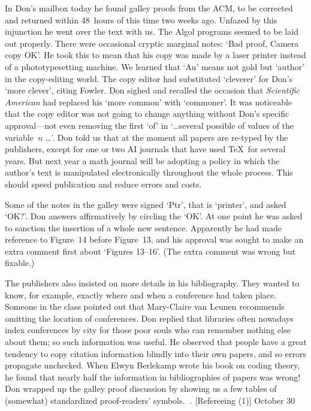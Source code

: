 In Don's mailbox today he found galley proofs from the ACM, to be corrected
and returned within 48~hours of this time two weeks ago. Unfazed
by this injunction he went over the text with us. The Algol programs
seemed to be laid out properly. There were occasional cryptic marginal
notes: `Bad proof, Camera copy OK'. He took this to mean that his copy
was made by a laser printer instead of a phototypesetting machine.
We learned that `Au' means not gold but `author' in the copy-editing
world. The copy editor had substituted `cleverer' for Don's `more
clever', citing Fowler. Don sighed and recalled the occasion that
{\sl Scientific American\/} had replaced his `more common' with
`commoner'. It was noticeable that the copy editor was not going to
change anything without Don's specific approval---not even removing
the first `of' in `\dots several possible of values of the variable~$n$
\dots'. 
Don told us that at the moment all papers are re-typed by the publishers,
except for one or two AI journals that have used \TeX\ for several
years. But next year a math journal will be adopting a policy in which
the author's text is manipulated electronically throughout the
whole process. This should speed publication and reduce errors and
costs. 

Some of the notes in the galley were signed `Ptr', that is
`printer', and asked `OK?'. Don answers affirmatively by circling
the `OK'. At one point he was asked to sanction the insertion
of a whole new sentence. Apparently he had made reference
to Figure~14 before Figure~13, and his approval was sought to make
an extra comment first about `Figures 13--16'. (The extra comment
was wrong but fixable.)

The publishers also insisted on more details in his bibliography.
They wanted to know, for example, exactly where and when a conference
had taken place. Someone in the class pointed out that Mary-Claire
van Leunen recommends omitting 
the location of conferences. Don replied that libraries often
nowadays index conferences by city for those poor souls
who can remember nothing else about them; so such information was useful.
He observed that people have a great tendency to copy citation information
blindly into their own papers, and so errors propagate unchecked.
When Elwyn Berlekamp wrote his book on coding theory, he found that nearly
half the information in bibliographies of papers was wrong! Don wrapped
up the galley proof discussion by showing us a few tables of (somewhat)
standardized proof-readers' symbols.
. [Refereeing (1)] \pmr October 30

